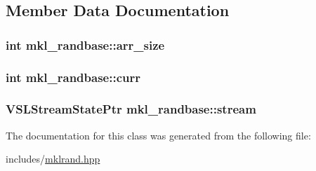 \subsection{Member Data Documentation}
\subsubsection[{\texorpdfstring{arr\+\_\+size}{arr_size}}]{\setlength{\rightskip}{0pt plus 5cm}int mkl\+\_\+randbase\+::arr\+\_\+size\hspace{0.3cm}{\ttfamily [protected]}}\hypertarget{classmkl__randbase_ae4fd17554da931b8d268f43b5c21f49b}{}\label{classmkl__randbase_ae4fd17554da931b8d268f43b5c21f49b}
\subsubsection[{\texorpdfstring{curr}{curr}}]{\setlength{\rightskip}{0pt plus 5cm}int mkl\+\_\+randbase\+::curr\hspace{0.3cm}{\ttfamily [protected]}}\hypertarget{classmkl__randbase_af654ef714fc77af1d4d815956034d130}{}\label{classmkl__randbase_af654ef714fc77af1d4d815956034d130}
\subsubsection[{\texorpdfstring{stream}{stream}}]{\setlength{\rightskip}{0pt plus 5cm}V\+S\+L\+Stream\+State\+Ptr mkl\+\_\+randbase\+::stream\hspace{0.3cm}{\ttfamily [protected]}}\hypertarget{classmkl__randbase_a130663e1e2c17ec4a7b77b3c2a6aa1d6}{}\label{classmkl__randbase_a130663e1e2c17ec4a7b77b3c2a6aa1d6}


The documentation for this class was generated from the following file\+:\begin{DoxyCompactItemize}
\item 
includes/\hyperlink{mklrand_8hpp}{mklrand.\+hpp}\end{DoxyCompactItemize}
